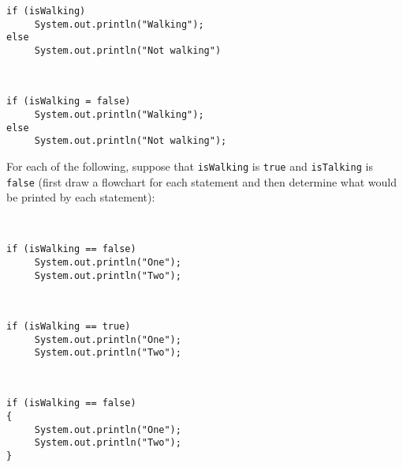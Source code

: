 \begin{EXRtwo}
\begin{EXRtwoLL}
\begin{jjjlisting}
\begin{lstlisting}
if (isWalking)
     System.out.println("Walking");
else
     System.out.println("Not walking")
\end{lstlisting}
\end{jjjlisting}

\item \mbox{ }

\begin{jjjlisting}
\begin{lstlisting}
if (isWalking = false)
     System.out.println("Walking");
else
     System.out.println("Not walking");
\end{lstlisting}
\end{jjjlisting}

\end{EXRtwoLL}

\item  For each of the following, suppose that {\tt isWalking}
is {\tt true} and {\tt isTalking} is {\tt false} (first
draw a flowchart for each statement and then determine
what would be printed by each statement):

\begin{EXRtwoLL}
\item \mbox{ }

\begin{jjjlisting}
\begin{lstlisting}
if (isWalking == false)
     System.out.println("One");
     System.out.println("Two");
\end{lstlisting}
\end{jjjlisting}

\item \mbox{ }

\begin{jjjlisting}
\begin{lstlisting}
if (isWalking == true)
     System.out.println("One");
     System.out.println("Two");
\end{lstlisting}
\end{jjjlisting}

\item \mbox{ }

\begin{jjjlisting}
\begin{lstlisting}
if (isWalking == false)
{
     System.out.println("One");
     System.out.println("Two");
}
\end{lstlisting}
\end{jjjlisting}


\end{EXRtwoLL}
\end{EXRtwo}
